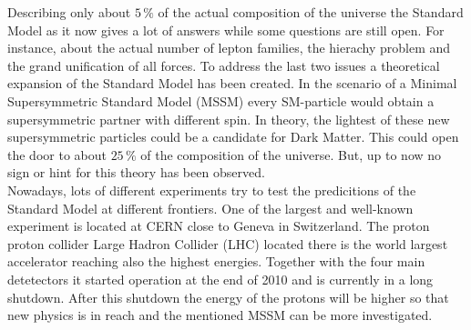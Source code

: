 Describing only about $5\,\%$ of the actual composition of the universe the Standard Model as it now gives a lot of answers while some questions are still open. For instance, about the actual number of lepton families, the hierachy problem and the grand unification of all forces. To address the last two issues a theoretical expansion of the Standard Model has been created. In the scenario of a Minimal Supersymmetric Standard Model (MSSM) every SM-particle would obtain a supersymmetric partner with different spin. In theory, the lightest of these new supersymmetric particles could be a candidate for Dark Matter. This could open the door to about $25\,\%$ of the composition of the universe. But, up to now no sign or hint for this theory has been observed. \\

Nowadays, lots of different experiments try to test the predicitions of the Standard Model at different frontiers. One of the largest and well-known experiment is located at CERN  close to Geneva in Switzerland. The proton proton collider Large Hadron Collider (LHC) located there is the world largest accelerator reaching also the highest energies. Together with the four main detetectors it started operation at the end of 2010 and is currently in a long shutdown. After this shutdown the energy of the protons will be higher so that new physics is in reach and the mentioned MSSM can be more investigated. \\


